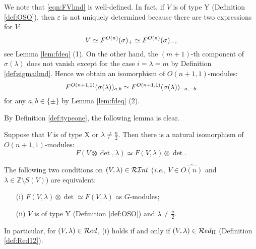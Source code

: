 \begin{remark}
\label{rem:FVlmd}
We note
 that \eqref{eqn:FVlmd} is well-defined.  
In fact, 
 if $V$ is of type Y (Definition \ref{def:OSO}), 
 then $\varepsilon$ is not uniquely determined 
 because there are two expressions for $V$:
\[
  V \simeq F^{{O(n)}}({\sigma})_+ \simeq F^{{O(n)}}({\sigma})_-, 
\]
 see Lemma \ref{lem:fdeq} (1).  
On the other hand, 
 the $(m+1)$-th component of $\sigma(\lambda)$ does not vanish
 except for the case $i=\lambda=m$
 by Definition \ref{def:sigmailmd}.  
Hence we obtain an isomorphism
 of $O(n+1,1)$-modules:
\[
   F^{{O(n+1,1)}}({\sigma(\lambda)})_{a,b}
   \simeq
   F^{{O(n+1,1)}}({\sigma(\lambda)})_{-a,-b}
\]
for any $a, b \in \{\pm\}$ by Lemma \ref{lem:fdeq} (2).  
\end{remark}

By Definition \ref{def:typeone}, 
 the following lemma is clear.  
\begin{lemma}
\label{lem:FVlmddet}
Suppose that $V$ is of type X 
 or $\lambda \ne \frac n 2$.  
Then there is a natural isomorphism
 of $O(n+1,1)$-modules:
\[
  F(V \otimes \det, \lambda)
\simeq
 F(V, \lambda) \otimes \det.  
\]
\end{lemma}
\begin{lemma}
\label{lem:FVlmdY}
The following two conditions on $(V,\lambda)\in {\mathcal{RI}}nt$
 ({\it{i.e.}}, 
 $V \in \widehat{O(n)}$
 and $\lambda \in {\mathbb{Z}} \setminus S(V)$)
 are equivalent:
\begin{enumerate}
\item[{\rm{(i)}}]
$F(V, \lambda) \otimes \det \simeq F(V, \lambda)$
 as $G$-modules;
\item[{\rm{(ii)}}]
$V$ is of type Y (Definition \ref{def:OSO})
 and $\lambda \ne \frac n 2$.  
\end{enumerate}
In particular,
 for $(V,\lambda)\in {\mathcal{R}}ed$, 
 (i) holds 
 if and only if $(V,\lambda)\in {\mathcal{R}}ed_{\operatorname{I I}}$
 (Definition \ref{def:Red12}).  
\end{lemma}

